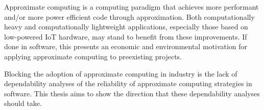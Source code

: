 
Approximate computing is a computing paradigm that achieves more performant and/or more power efficient code through approximation. Both computationally heavy and computationally lightweight applications, especially those based on low-powered IoT hardware, may stand to benefit from these improvements. If done in software, this presents an economic and environmental motivation for applying approximate computing to preexisting projects. 

Blocking the adoption of approximate computing in industry is the lack of dependability analyses of the reliability of approximate computing strategies in software. This thesis aims to show the direction that these dependability analyses should take.